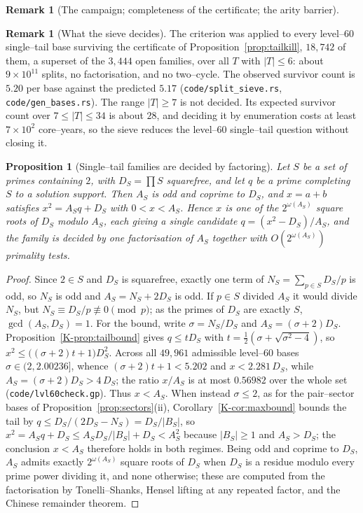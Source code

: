 \documentclass[11pt]{article}
\newtheorem{proposition}[theorem]{Proposition}
\theoremstyle{definition}
\newtheorem{remark}[theorem]{Remark}
\begin{document}
\begin{remark}[The campaign; completeness of the certificate; the arity barrier]
\begin{remark}[What the sieve decides]\label{rem:splitsieverun}
The criterion was applied to every level--$60$ single--tail base surviving the certificate of
Proposition~\ref{prop:tailkill}, $18{,}742$ of them, a superset of the $3{,}444$ open families, over
all $T$ with $|T|\le6$: about $9\times10^{11}$ splits, no factorisation, and no two--cycle. The
observed survivor count is $5.20$ per base against the predicted $5.17$
\textup{(\texttt{code/split\_sieve.rs}, \texttt{code/gen\_bases.rs})}. The range $|T|\ge7$ is not
decided. Its expected survivor count over $7\le|T|\le34$ is about $28$, and deciding it by
enumeration costs at least $7\times10^{2}$ core--years, so the sieve reduces the level--$60$
single--tail question without closing it.
\end{remark}

\begin{proposition}[Single--tail families are decided by factoring]\label{prop:lvl60factor}
Let $S$ be a set of primes containing $2$, with $D_S=\prod S$ squarefree, and let $q$ be a prime
completing $S$ to a solution support. Then $A_S$ is odd and coprime to $D_S$, and $x=a+b$ satisfies
$x^2=A_Sq+D_S$ with $0<x<A_S$. Hence $x$ is one of the $2^{\omega(A_S)}$ square roots of $D_S$ modulo
$A_S$, each giving a single candidate $q=(x^2-D_S)/A_S$, and the family is decided by one
factorisation of $A_S$ together with $O(2^{\omega(A_S)})$ primality tests.
\end{proposition}
\begin{proof}
Since $2\in S$ and $D_S$ is squarefree, exactly one term of $N_S=\sum_{p\in S}D_S/p$ is odd, so $N_S$ is
odd and $A_S=N_S+2D_S$ is odd. If $p\in S$ divided $A_S$ it would divide $N_S$, but $N_S\equiv D_S/p
\not\equiv0\pmod p$; as the primes of $D_S$ are exactly $S$, $\gcd(A_S,D_S)=1$. For the bound, write
$\sigma=N_S/D_S$ and $A_S=(\sigma+2)D_S$. Proposition~\ref{K-prop:tailbound} gives $q\le tD_S$ with
$t=\tfrac12(\sigma+\sqrt{\sigma^2-4})$, so $x^2\le\bigl((\sigma+2)t+1\bigr)D_S^2$. Across all
$49{,}961$ admissible level--$60$ bases $\sigma\in(2,2.00236]$, whence $(\sigma+2)t+1<5.202$ and
$x<2.281\,D_S$, while $A_S=(\sigma+2)D_S>4\,D_S$; the ratio $x/A_S$ is at most $0.56982$ over the whole
set \textup{(\texttt{code/lvl60check.gp})}. Thus $x<A_S$. When instead $\sigma\le2$, as for the
pair--sector bases of Proposition~\ref{prop:sectors}(ii), Corollary~\ref{K-cor:maxbound} bounds the tail
by $q\le D_S/(2D_S-N_S)=D_S/|B_S|$, so $x^2=A_Sq+D_S\le A_SD_S/|B_S|+D_S<A_S^2$ because $|B_S|\ge1$ and
$A_S>D_S$; the conclusion $x<A_S$ therefore holds in both regimes. Being odd and coprime to $D_S$,
$A_S$ admits exactly $2^{\omega(A_S)}$ square roots of $D_S$ when $D_S$ is a residue modulo every prime
power dividing it, and none otherwise; these are computed from the factorisation by Tonelli--Shanks,
Hensel lifting at any repeated factor, and the Chinese remainder theorem.
\end{proof}


\end{remark}
\end{document}
